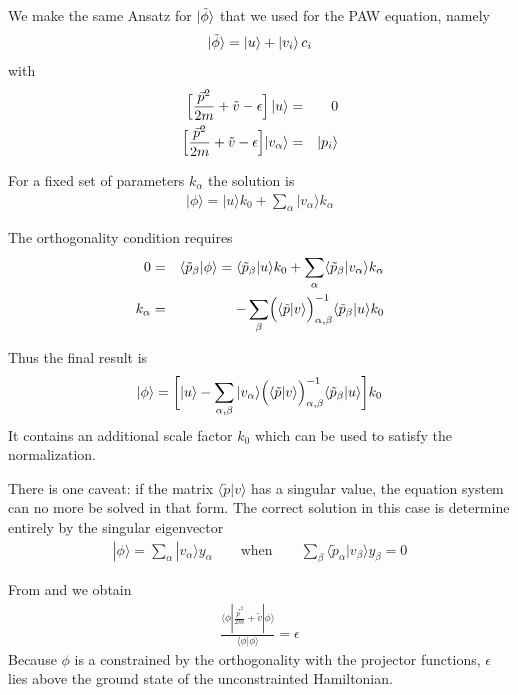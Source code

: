 \documentclass[11pt,a4paper]{report}
\begin{document}
We make the same Ansatz for $\ket{\tilde{\phi}}$ that we used for the
PAW equation, namely
\begin{equation}
\ket{\tilde{\phi}}=\ket{u}+\ket{v_i}c_i
\label{eq:orthogonalradeqansatz}
\end{equation}
with
\begin{eqnarray}
\Bigl\lbrack
\frac{\vec{p}^2}{2m}+\tilde{v}-\epsilon
\Bigr\rbrack \ket{u} &=& 0
\\
\Bigl\lbrack
\frac{\vec{p}^2}{2m}+\tilde{v}-\epsilon
\Bigr\rbrack |v_\alpha\rangle& =& |p_i\rangle
\end{eqnarray}


For a fixed set of parameters $k_\alpha$ the solution is
\begin{eqnarray}
|\phi\rangle=|u\rangle k_0+\sum_\alpha |v_\alpha\rangle k_\alpha
\end{eqnarray}

The orthogonality condition requires
\begin{eqnarray}
0&=&\langle\tilde{p}_\beta|\phi\rangle
=\langle\tilde{p}_\beta|u\rangle k_0
+\sum_\alpha \langle\tilde{p}_\beta|v_\alpha\rangle k_\alpha
\\
k_\alpha&=&-\sum_\beta 
\Bigl(\langle\tilde{p}|v\rangle\Bigr)^{-1}_{\alpha,\beta}
\langle\tilde{p}_\beta|u\rangle k_0
\end{eqnarray}

Thus the final result is
\begin{eqnarray}
|\phi\rangle=\biggl[|u\rangle-\sum_{\alpha,\beta} |v_\alpha\rangle
\Bigl(\langle\tilde{p}|v\rangle\Bigr)^{-1}_{\alpha,\beta}
\langle\tilde{p}_\beta|u\rangle\biggr] k_0
\end{eqnarray}
It contains an additional scale factor $k_0$ which can be used to
satisfy the normalization.

There is one caveat: if the matrix $\langle\tilde{p}|v\rangle$ has a
singular value, the equation system can no more be solved in that
form.  The correct solution in this case is determine entirely by the
singular eigenvector
\begin{eqnarray}
|\phi\rangle=\sum_{\alpha} |v_\alpha\rangle y_\alpha
\qquad\text{when}\qquad
\sum_\beta \langle\tilde{p}_\alpha|v_\beta\rangle y_\beta=0
\end{eqnarray}


From  and  we obtain
\begin{eqnarray}
\frac{\langle\phi|\frac{\vec{p}^2}{2m}+\tilde{v}|\phi\rangle}
{\langle\phi|\phi\rangle}
=\epsilon
\end{eqnarray}
Because $\phi$ is a constrained by the orthogonality with the
projector functions, $\epsilon$ lies above the ground state of the
unconstrainted Hamiltonian.
\end{document}
